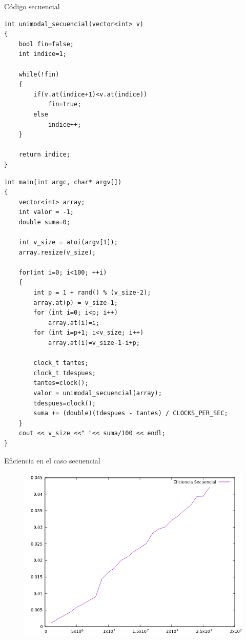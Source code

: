 \documentclass[12pt]{beamer}
\begin{document}
\begin{frame}[fragile]{Código secuencial}
	\begin{lstlisting}
int unimodal_secuencial(vector<int> v)
{
	bool fin=false;
  	int indice=1;

  	while(!fin)
  	{
     	if(v.at(indice+1)<v.at(indice))
      		fin=true;
     	else
      		indice++;
  	}

  	return indice;
}
	\end{lstlisting}
\end{frame}

\begin{frame}[fragile]
	\begin{lstlisting}
int main(int argc, char* argv[])
{
	vector<int> array;
  	int valor = -1;
	double suma=0;

  	int v_size = atoi(argv[1]);
  	array.resize(v_size);

	for(int i=0; i<100; ++i)
	{
		int p = 1 + rand() % (v_size-2);
  		array.at(p) = v_size-1;
  		for (int i=0; i<p; i++)
  			array.at(i)=i;
  		for (int i=p+1; i<v_size; i++)
  			array.at(i)=v_size-1-i+p;

  		clock_t tantes;
  		clock_t tdespues;
  		tantes=clock();
  		valor = unimodal_secuencial(array);
  		tdespues=clock();
		suma += (double)(tdespues - tantes) / CLOCKS_PER_SEC;
	}
  	cout << v_size <<" "<< suma/100 << endl;
}
	\end{lstlisting}

\end{frame}

\begin{frame}{Eficiencia en el caso secuencial}

\begin{figure}[H] 
\centering
\includegraphics[angle=0,scale=0.5]{img/Eficiencia_sec.png} 
\end{figure}

\end{frame}
\end{document}
